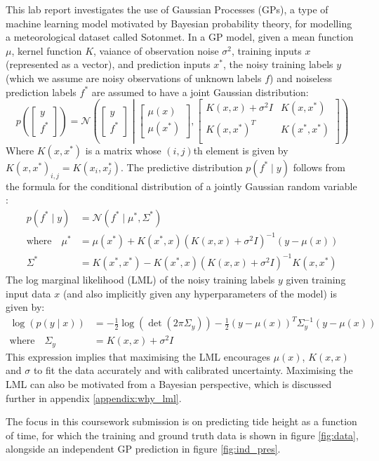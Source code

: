 This lab report investigates the use of Gaussian Processes (GPs), a type of machine learning model motivated by Bayesian probability theory, for modelling a meteorological dataset called Sotonmet. In a GP model, given a mean function $\mu$, kernel function $K$, vaiance of observation noise $\sigma^2$, training inputs $x$ (represented as a vector), and prediction inputs $x^*$, the noisy training labels $y$ (which we assume are noisy observations of unknown labels $f$) and noiseless prediction labels $f^*$ are assumed to have a joint Gaussian distribution:
\begin{equation}
    p\left( \begin{bmatrix}
        y \\
        f^*
    \end{bmatrix} \right)
    = \mathcal{N} \left( \begin{bmatrix}
        y \\
        f^*
    \end{bmatrix} \middle| \begin{bmatrix}
        \mu(x) \\
        \mu(x^*)
    \end{bmatrix}, \begin{bmatrix}
        K(x, x) + \sigma^2 I & K(x, x^*) \\
        K(x, x^*)^T & K(x^*, x^*) \\
    \end{bmatrix} \right)
\end{equation}
Where $K(x, x^*)$ is a matrix whose $(i, j)$th element is given by $K(x, x^*)_{i,j} = K(x_i, x^*_j)$. The predictive distribution $p(f^* \mid y)$ follows from the formula for the conditional distribution of a jointly Gaussian random variable \cite{bishop2006pattern}:
\begin{align}
    p(f^* \mid y) &= \mathcal{N}\left(f^* \mid \mu^*, \Sigma^* \right) \label{eq:conditional distribution} \\
    \text{where} \quad \mu^* &= \mu(x^*) + K(x^*, x) \left( K(x, x) + \sigma^2 I \right)^{-1} (y - \mu(x)) \label{eq:conditional mean} \\
    \Sigma^* &= K(x^*, x^*) - K(x^*, x) \left( K(x, x) + \sigma^2 I \right) ^{-1} K(x, x^*) \label{eq:conditional variance}
\end{align}
The log marginal likelihood (LML) of the noisy training labels $y$ given training input data $x$ (and also implicitly given any hyperparameters of the model) is given by:
\begin{align}
    \log \left( p(y \mid x) \right) &= -\frac{1}{2}\log\left(\det \left(2\pi \Sigma_y \right)\right) -\frac{1}{2}(y - \mu(x))^T \Sigma_y^{-1} (y - \mu(x)) \\
    \text{where} \quad \Sigma_y &= K(x, x) + \sigma^2 I
\end{align}
This expression implies that maximising the LML encourages $\mu(x)$, $K(x,x)$ and $\sigma$ to fit the data accurately and with calibrated uncertainty. Maximising the LML can also be motivated from a Bayesian perspective, which is discussed further in appendix \ref{appendix:why_lml}.

The focus in this coursework submission is on predicting tide height as a function of time, for which the training and ground truth data is shown in figure \ref{fig:data}, alongside an independent GP prediction in figure \ref{fig:ind_pres}.
